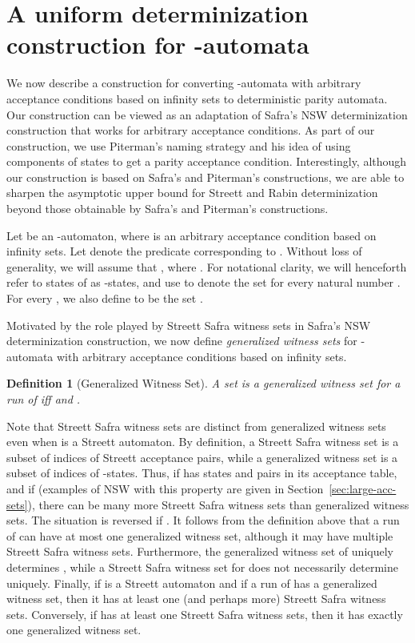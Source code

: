 \documentclass[3p]{elsarticle}
\newtheorem{definition}[theorem]{Definition}
\begin{document}
\section{A uniform determinization construction for -automata}

We now describe a construction for converting -automata with
arbitrary acceptance conditions based on infinity sets to
deterministic parity automata.  Our construction can be viewed as an
adaptation of Safra's NSW determinization construction that works for
arbitrary acceptance conditions.  As part of our construction, we use
Piterman's naming strategy and his idea of using  components of
states to get a parity acceptance condition.  Interestingly, although
our construction is based on Safra's and Piterman's constructions, we
are able to sharpen the asymptotic upper bound for Streett and Rabin
determinization beyond those obtainable by Safra's and Piterman's
constructions.

Let  be an -automaton,
where  is an arbitrary acceptance condition based on infinity
sets.  Let  denote the predicate corresponding to .
Without loss of generality, we will assume that , where . For notational clarity, we will
henceforth refer to states of  as -states, and use  to
denote the set  for every natural number .
For every , we also define  to be the set .

Motivated by the role played by Streett Safra witness sets in Safra's
NSW determinization construction, we now define \emph{generalized
  witness sets} for -automata with arbitrary acceptance
conditions based on infinity sets.
\begin{definition}[Generalized Witness Set]
A set  is a generalized witness set for a run 
of  iff  and .
\end{definition}
Note that Streett Safra witness sets are distinct from generalized
witness sets even when  is a Streett automaton.  By definition, a
Streett Safra witness set is a subset of indices of Streett acceptance
pairs, while a generalized witness set is a subset of indices of
-states.  Thus, if  has  states and  pairs in its
acceptance table, and if  (examples of NSW with this property
are given in Section~\ref{sec:large-acc-sets}), there can be many more
Streett Safra witness sets than generalized witness sets. The
situation is reversed if .  It follows from the definition
above that a run  of  can have at most one generalized
witness set, although it may have multiple Streett Safra witness sets.
Furthermore, the generalized witness set of  uniquely determines
, while a Streett Safra witness set for  does not
necessarily determine  uniquely.  Finally, if  is a
Streett automaton and if a run  of  has a generalized
witness set, then it has at least one (and perhaps more) Streett Safra
witness sets.  Conversely, if  has at least one Streett Safra
witness sets, then it has exactly one generalized witness set.
\end{document}
